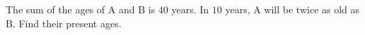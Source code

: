 The sum of the ages of A and B is $40$ years. In $10$ years, A will be twice as old as B. Find their present ages.
